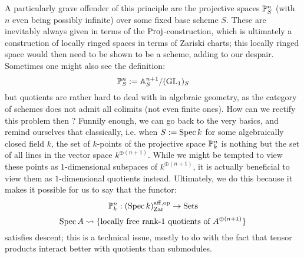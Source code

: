             A particularly grave offender of this principle are the projective spaces $\P^n_S$ (with $n$ even being possibly infinite) over some fixed base scheme $S$. These are inevitably always given in terms of the $\Proj$-construction, which is ultimately a construction of locally ringed spaces in terms of Zariski charts; this locally ringed space would then need to be shown to be a scheme, adding to our despair. Sometimes one might also see the definition:
                $$\P^n_S := \A^{n + 1}_S/(\GL_1)_S$$
            but quotients are rather hard to deal with in algebraic geometry, as the category of schemes does not admit all colimits (not even finite ones). How can we rectify this problem then ? Funnily enough, we can go back to the very basics, and remind ourselves that classically, i.e. when $S := \Spec k$ for some algebraically closed field $k$, the set of $k$-points of the projective space $\P^n_k$ is nothing but the set of all lines in the vector space $k^{\oplus (n + 1)}$. While we might be tempted to view these points as $1$-dimensional subspaces of $k^{\oplus (n + 1)}$, it is actually beneficial to view them as $1$-dimensional quotients instead. Ultimately, we do this because it makes it possible for us to say that the functor:
                $$\P^n_k: (\Spec k)_{\Zar}^{\aff, \op} \to \Sets$$
                $$\Spec A \mapsto \{ \text{locally free rank-$1$ quotients of $A^{\oplus (n + 1)}$} \}$$
            satisfies descent; this is a technical issue, mostly to do with the fact that tensor products interact better with quotients than submodules.
    
